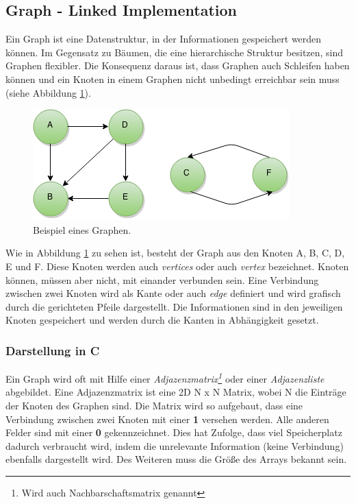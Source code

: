 \subsection{Graph - Linked Implementation}\label{kap:graph} 
Ein Graph ist eine Datenstruktur, in der Informationen gespeichert werden können. Im Gegensatz zu Bäumen, die eine hierarchische Struktur besitzen, sind Graphen flexibler. Die Konsequenz daraus ist, dass Graphen auch Schleifen haben können und ein Knoten in einem Graphen nicht unbedingt erreichbar sein muss (siehe Abbildung \ref{fig:Graph}).
\begin{figure}[h]
	\centering
	\includegraphics[scale=0.5]{images/Graph.png} 
	\caption{Beispiel eines Graphen.}
	\label{fig:Graph}
\end{figure}
Wie in Abbildung \ref{fig:Graph} zu sehen ist, besteht der Graph aus den Knoten A, B, C, D, E und F. Diese Knoten werden auch \textit{vertices} oder auch \textit{vertex} bezeichnet. Knoten können, müssen aber nicht, mit einander verbunden sein. Eine Verbindung zwischen zwei Knoten wird als Kante oder auch \textit{edge} definiert und wird grafisch durch die gerichteten Pfeile dargestellt. Die Informationen sind in den jeweiligen Knoten gespeichert und werden durch die Kanten in Abhängigkeit gesetzt. 

\subsubsection*{Darstellung in C}
Ein Graph wird oft mit Hilfe einer \textit{Adjazenzmatrix\footnote{Wird auch Nachbarschaftsmatrix genannt}} oder einer \textit{Adjazenzliste} abgebildet. Eine Adjazenzmatrix ist eine 2D N x N Matrix, wobei N die Einträge der Knoten des Graphen sind. Die Matrix wird so aufgebaut, dass eine Verbindung zwischen zwei Knoten mit einer \textbf{1} versehen werden. Alle anderen Felder sind mit einer \textbf{0} gekennzeichnet. Dies hat Zufolge, dass viel Speicherplatz dadurch verbraucht wird, indem die unrelevante Information (keine Verbindung) ebenfalls dargestellt wird. Des Weiteren muss die Größe des Arrays bekannt sein. 

